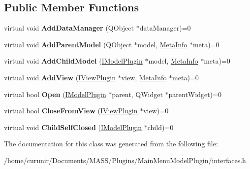 \subsection*{Public Member Functions}
\begin{DoxyCompactItemize}
\item 
virtual void {\bfseries Add\+Data\+Manager} (Q\+Object $\ast$data\+Manager)=0\hypertarget{class_i_model_plugin_ab6612f3eaf63fcf66d61ca4522e6399a}{}\label{class_i_model_plugin_ab6612f3eaf63fcf66d61ca4522e6399a}

\item 
virtual void {\bfseries Add\+Parent\+Model} (Q\+Object $\ast$model, \hyperlink{struct_meta_info}{Meta\+Info} $\ast$meta)=0\hypertarget{class_i_model_plugin_a984044bf0128b7fe19b2871a244ed030}{}\label{class_i_model_plugin_a984044bf0128b7fe19b2871a244ed030}

\item 
virtual void {\bfseries Add\+Child\+Model} (\hyperlink{class_i_model_plugin}{I\+Model\+Plugin} $\ast$model, \hyperlink{struct_meta_info}{Meta\+Info} $\ast$meta)=0\hypertarget{class_i_model_plugin_a8427d2cff223c37abb0c4d856b244c4d}{}\label{class_i_model_plugin_a8427d2cff223c37abb0c4d856b244c4d}

\item 
virtual void {\bfseries Add\+View} (\hyperlink{class_i_view_plugin}{I\+View\+Plugin} $\ast$view, \hyperlink{struct_meta_info}{Meta\+Info} $\ast$meta)=0\hypertarget{class_i_model_plugin_aa209bc554d02bf3b04b64a7003a9ace4}{}\label{class_i_model_plugin_aa209bc554d02bf3b04b64a7003a9ace4}

\item 
virtual bool {\bfseries Open} (\hyperlink{class_i_model_plugin}{I\+Model\+Plugin} $\ast$parent, Q\+Widget $\ast$parent\+Widget)=0\hypertarget{class_i_model_plugin_a1d0eb900e7bb460ab957ae90fd966d76}{}\label{class_i_model_plugin_a1d0eb900e7bb460ab957ae90fd966d76}

\item 
virtual bool {\bfseries Close\+From\+View} (\hyperlink{class_i_view_plugin}{I\+View\+Plugin} $\ast$view)=0\hypertarget{class_i_model_plugin_ae6e9c6e8eb422b31d3a32c9c7bf60152}{}\label{class_i_model_plugin_ae6e9c6e8eb422b31d3a32c9c7bf60152}

\item 
virtual void {\bfseries Child\+Self\+Closed} (\hyperlink{class_i_model_plugin}{I\+Model\+Plugin} $\ast$child)=0\hypertarget{class_i_model_plugin_a19a398057393941101d581b98db4bedf}{}\label{class_i_model_plugin_a19a398057393941101d581b98db4bedf}

\end{DoxyCompactItemize}


The documentation for this class was generated from the following file\+:\begin{DoxyCompactItemize}
\item 
/home/curunir/\+Documents/\+M\+A\+S\+S/\+Plugins/\+Main\+Menu\+Model\+Plugin/interfaces.\+h\end{DoxyCompactItemize}
